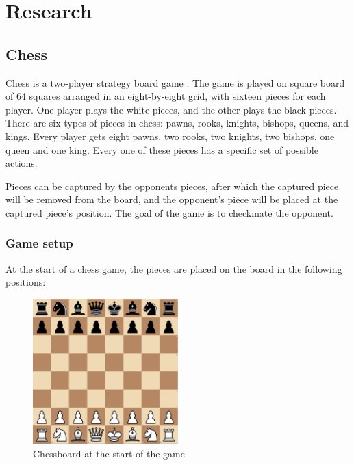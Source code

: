 \documentclass{article}
\begin{document}
\newpage
\section{Research}

% 
%
%

\subsection{Chess}

Chess is a two-player strategy board game \cite{Chess2022a}. The game is played on square board of 64 squares arranged in an eight-by-eight grid, 
with sixteen pieces for each player. One player plays the white pieces, and the other plays the black pieces.
There are six types of pieces in chess: pawns, rooks, knights, bishops, queens, and kings. Every player gets eight pawns,
two rooks, two knights, two bishops, one queen and one king. Every one of these pieces has a specific set of possible actions. 

Pieces can be captured by the opponents pieces, after which the captured piece will be removed from the board, and the opponent's piece
will be placed at the captured piece's position. The goal of the game is to checkmate the opponent.

\subsubsection{Game setup}

At the start of a chess game, the pieces are placed on the board in the following positions:

\begin{figure}[H]
    \centering
    \includegraphics[width=0.5\textwidth]{img/chess-initial.png}
    \caption{Chessboard at the start of the game \cite{ChessBoardEditor}}
\end{figure}
\end{document}
